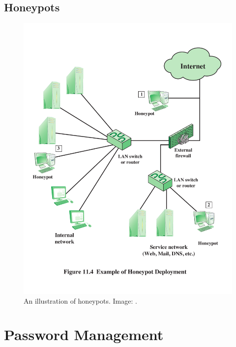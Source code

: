 \documentclass{beamer}
\begin{document}
\subsection{Honeypots}

\begin{frame}{\insertsubsectionhead}
  \begin{figure}
    \includegraphics[height=0.7\textheight]{honeypot.pdf}
    \caption{An illustration of honeypots.
      Image: \cite{Stallings2013nse}.}
  \end{figure}
\end{frame}


\section{Password Management}
\end{document}
